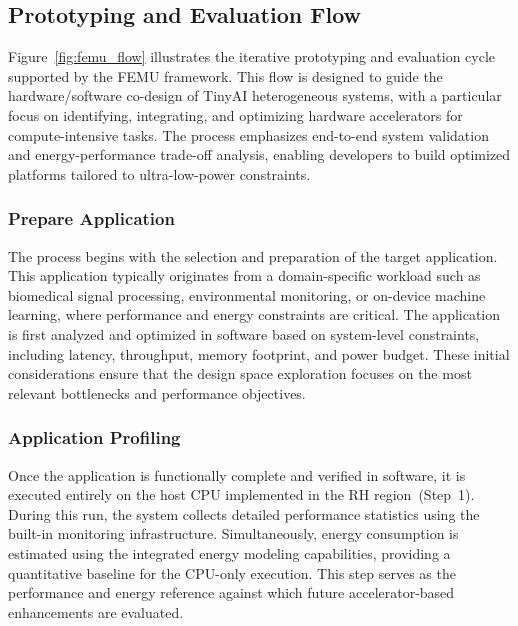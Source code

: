         \subsection{Prototyping and Evaluation Flow}
        
            Figure~\ref{fig:femu_flow} illustrates the iterative prototyping and evaluation cycle supported by the \mbox{FEMU} framework. This flow is designed to guide the hardware/software co-design of TinyAI heterogeneous systems, with a particular focus on identifying, integrating, and optimizing hardware accelerators for compute-intensive tasks. The process emphasizes end-to-end system validation and energy-performance trade-off analysis, enabling developers to build optimized platforms tailored to ultra-low-power constraints.

            \subsubsection*{Prepare Application}
            
                The process begins with the selection and preparation of the target application. This application typically originates from a domain-specific workload such as biomedical signal processing, environmental monitoring, or on-device machine learning, where performance and energy constraints are critical. The application is first analyzed and optimized in software based on system-level constraints, including latency, throughput, memory footprint, and power budget. These initial considerations ensure that the design space exploration focuses on the most relevant bottlenecks and performance objectives.
            
            \subsubsection*{Application Profiling}
            
                Once the application is functionally complete and verified in software, it is executed entirely on the host CPU implemented in the RH region~(Step~1). During this run, the system collects detailed performance statistics using the built-in monitoring infrastructure. Simultaneously, energy consumption is estimated using the integrated energy modeling capabilities, providing a quantitative baseline for the CPU-only execution. This step serves as the performance and energy reference against which future accelerator-based enhancements are evaluated.
            
